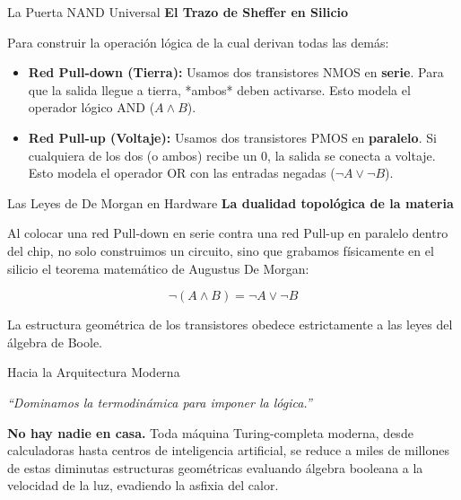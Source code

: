 \documentclass[10pt, aspectratio=169]{beamer}
\begin{document}
\begin{frame}{La Puerta NAND Universal}
    \vspace{0.4cm}
    \Large \textbf{El Trazo de Sheffer en Silicio}
    
    \vspace{0.4cm}
    \normalsize
    Para construir la operación lógica de la cual derivan todas las demás:
    
    \begin{itemize}
        \item \textbf{Red Pull-down (Tierra):} Usamos dos transistores NMOS en \textbf{serie}. Para que la salida llegue a tierra, *ambos* deben activarse. Esto modela el operador lógico AND ($A \land B$).
        \item \textbf{Red Pull-up (Voltaje):} Usamos dos transistores PMOS en \textbf{paralelo}. Si cualquiera de los dos (o ambos) recibe un $0$, la salida se conecta a voltaje. Esto modela el operador OR con las entradas negadas ($\neg A \lor \neg B$).
    \end{itemize}
\end{frame}

\begin{frame}{Las Leyes de De Morgan en Hardware}
    \vspace{0.6cm}
    \Large \textbf{La dualidad topológica de la materia}
    
    \vspace{0.6cm}
    \normalsize
    Al colocar una red Pull-down en serie contra una red Pull-up en paralelo dentro del chip, no solo construimos un circuito, sino que grabamos físicamente en el silicio el teorema matemático de Augustus De Morgan:
    
    $$\neg(A \land B)=\neg A \lor \neg B$$
    
    \vspace{0.4cm}
    La estructura geométrica de los transistores obedece estrictamente a las leyes del álgebra de Boole.
\end{frame}

\begin{frame}{Hacia la Arquitectura Moderna}
    \vspace{0.8cm}
    \begin{center}
        \huge \textit{``Dominamos la termodinámica para imponer la lógica.''}
    \end{center}
    
    \vspace{0.8cm}
    \normalsize
    \textbf{No hay nadie en casa.} Toda máquina Turing-completa moderna, desde calculadoras hasta centros de inteligencia artificial, se reduce a miles de millones de estas diminutas estructuras geométricas evaluando álgebra booleana a la velocidad de la luz, evadiendo la asfixia del calor.
    
    \vspace{0.6cm}
\end{frame}
\end{document}
